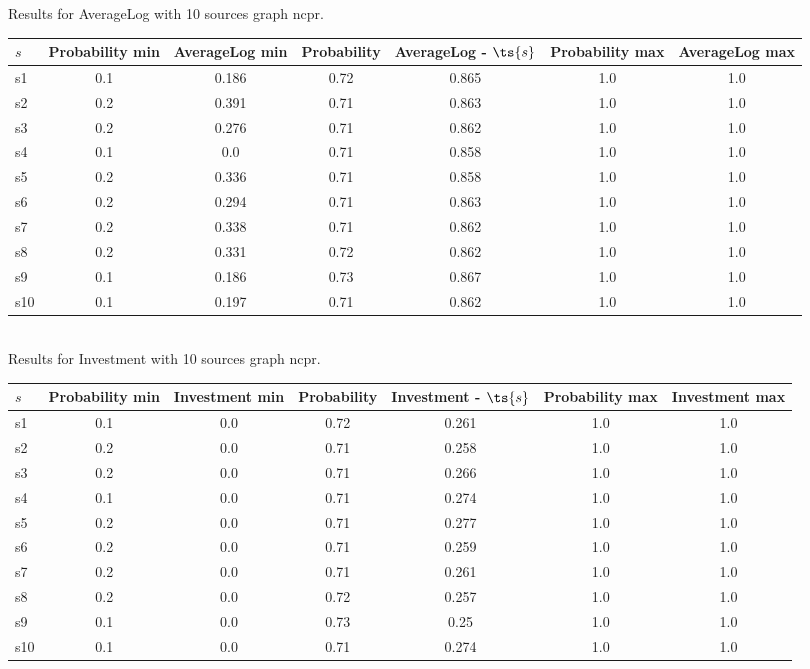 \documentclass{article}
\begin{document}
\noindent Results for AverageLog with 10 sources graph ncpr.

\noindent\begin{tabular}{|l|c|c|c|c|c|c|}
\hline
$s$& Probability min & AverageLog min & Probability & AverageLog - $\ts{s}$ & Probability max & AverageLog max\\
\hline
s1 &0.1 & 0.186 & 0.72 & 0.865 & 1.0 & 1.0\\
\hline
s2 &0.2 & 0.391 & 0.71 & 0.863 & 1.0 & 1.0\\
\hline
s3 &0.2 & 0.276 & 0.71 & 0.862 & 1.0 & 1.0\\
\hline
s4 &0.1 & 0.0 & 0.71 & 0.858 & 1.0 & 1.0\\
\hline
s5 &0.2 & 0.336 & 0.71 & 0.858 & 1.0 & 1.0\\
\hline
s6 &0.2 & 0.294 & 0.71 & 0.863 & 1.0 & 1.0\\
\hline
s7 &0.2 & 0.338 & 0.71 & 0.862 & 1.0 & 1.0\\
\hline
s8 &0.2 & 0.331 & 0.72 & 0.862 & 1.0 & 1.0\\
\hline
s9 &0.1 & 0.186 & 0.73 & 0.867 & 1.0 & 1.0\\
\hline
s10 &0.1 & 0.197 & 0.71 & 0.862 & 1.0 & 1.0\\
\hline
\end{tabular}\\

\noindent Results for Investment with 10 sources graph ncpr.

\noindent\begin{tabular}{|l|c|c|c|c|c|c|}
\hline
$s$& Probability min & Investment min & Probability & Investment - $\ts{s}$ & Probability max & Investment max\\
\hline
s1 &0.1 & 0.0 & 0.72 & 0.261 & 1.0 & 1.0\\
\hline
s2 &0.2 & 0.0 & 0.71 & 0.258 & 1.0 & 1.0\\
\hline
s3 &0.2 & 0.0 & 0.71 & 0.266 & 1.0 & 1.0\\
\hline
s4 &0.1 & 0.0 & 0.71 & 0.274 & 1.0 & 1.0\\
\hline
s5 &0.2 & 0.0 & 0.71 & 0.277 & 1.0 & 1.0\\
\hline
s6 &0.2 & 0.0 & 0.71 & 0.259 & 1.0 & 1.0\\
\hline
s7 &0.2 & 0.0 & 0.71 & 0.261 & 1.0 & 1.0\\
\hline
s8 &0.2 & 0.0 & 0.72 & 0.257 & 1.0 & 1.0\\
\hline
s9 &0.1 & 0.0 & 0.73 & 0.25 & 1.0 & 1.0\\
\hline
s10 &0.1 & 0.0 & 0.71 & 0.274 & 1.0 & 1.0\\
\hline
\end{tabular}\\
\end{document}
